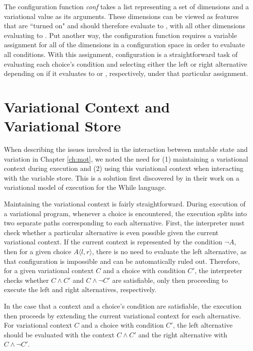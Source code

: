 \documentclass[onehalf,11pt]{beavtex}
\newcommand{\tagtree}[3]{#1 \langle #2, #3 \rangle}
\begin{document}
The configuration function \emph{conf} takes a list representing a set of dimensions and a variational value as its arguments. These dimensions can be viewed as
features that are ``turned on" and should therefore evaluate to , with all other dimensions evaluating to . Put another way, the configuration
function requires a variable assignment for all of the dimensions in a configuration space in order to evaluate all conditions. With this assignment, configuration
is a straightforward task of evaluating each choice's condition and selecting either the left or right alternative depending on if it evaluates to  or , respectively,
under that particular assignment.

\section{Variational Context and Variational Store}

When describing the issues involved in the interaction between mutable state and variation in Chapter \ref{ch:mot}, we noted the need for (1) maintaining a variational context
during execution and (2) using this variational context when interacting with the variable store. This is a solution first discovered by \cite{varwhile} in their work on a
variational model of execution for the While language.

Maintaining the variational context is fairly straightforward. During execution of a variational program, whenever a choice is encountered, the execution splits into
two separate paths corresponding to each alternative. First, the interpreter must check whether a particular alternative is even possible given the current variational
context. If the current context is represented by the condition $\neg A$, then for a given choice $\tagtree{A}{l}{r}$, there is no need to evaluate the left alternative, as that
configuration is impossible and can be automatically ruled out. Therefore, for a given variational context $C$ and a choice with condition $C'$, the interpreter checks
whether $C \wedge C'$ and $C \wedge \neg C'$ are satisfiable, only then proceeding to execute the left and right alternatives, respectively.

In the case that a context and a choice's condition are satisfiable, the execution then proceeds by extending the current variational context for each alternative.
For variational context $C$ and a choice with condition $C'$, the left alternative should be evaluated with the context $C \wedge C'$ and the right alternative with
$C \wedge \neg C'$.
\end{document}

